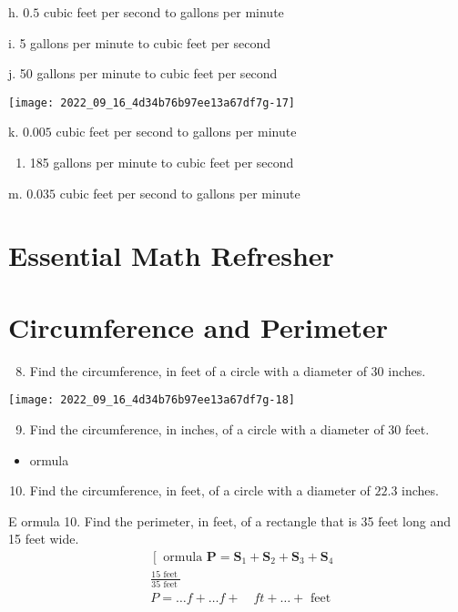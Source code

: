 \begin{enumerate}
h. $0.5$ cubic feet per second to gallons per minute

i. 5 gallons per minute to cubic feet per second

j. 50 gallons per minute to cubic feet per second

\texttt{[image: 2022\_09\_16\_4d34b76b97ee13a67df7g-17]}

k. $0.005$ cubic feet per second to gallons per minute

\begin{enumerate}
  \item 185 gallons per minute to cubic feet per second
\end{enumerate}
m. $0.035$ cubic feet per second to gallons per minute

\section{Essential Math Refresher}
\section{Circumference and Perimeter}
\begin{enumerate}
  \setcounter{enumi}{7}
  \item Find the circumference, in feet of a circle with a diameter of 30 inches.
\end{enumerate}
\texttt{[image: 2022\_09\_16\_4d34b76b97ee13a67df7g-18]}

\begin{enumerate}
  \setcounter{enumi}{8}
  \item Find the circumference, in inches, of a circle with a diameter of 30 feet.
\end{enumerate}
\begin{itemize}
  \item ormula
\end{itemize}
\begin{enumerate}
  \setcounter{enumi}{9}
  \item Find the circumference, in feet, of a circle with a diameter of $22.3$ inches.
\end{enumerate}
E ormula 10. Find the perimeter, in feet, of a rectangle that is 35 feet long and 15 feet wide.
$$
\begin{aligned}
& \left[\text { ormula } \mathbf{P}=\mathbf{S}_{1}+\mathbf{S}_{2}+\mathbf{S}_{3}+\mathbf{S}_{4}\right. \\
& \frac{15 \text { feet }}{35 \text { feet }} \\
& P=\ldots f+\ldots f+\quad f t+\ldots+\text { feet }
\end{aligned}
$$


\end{enumerate}
